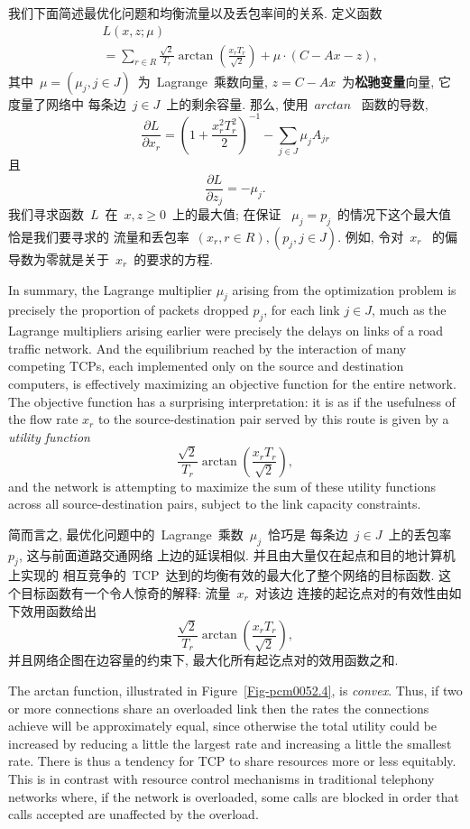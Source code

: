 \documentclass[a4paper,12pt, twocolumn]{article}
\begin{document}
我们下面简述最优化问题和均衡流量以及丢包率间的关系. 
定义函数
\begin{align*}
&L(x,z  ; \mu )  \\
&=\sum_{r\in R} \frac{\sqrt{2} }{T_r}    
\arctan \left( \frac{x_r T_r}{\sqrt{2} } \right)
+\mu \cdot (C -Ax-z ),
\end{align*}
其中~$\mu = (\mu_j, j \in J)$~为~Lagrange~乘数向量, 
$z = C- Ax$~为\textbf{松驰变量}向量, 它度量了网络中
每条边~$j \in J$~上的剩余容量. 那么, 使用~$arctan$~
函数的导数, 
$${{\frac{\partial L}{\partial x_r}}} = 
 \left( 1 +
\frac{x_r^2T_r^2}{2} \right)^{-1} 
 -\sum_{j\in J}\mu_j A_{jr}
$$
且
$${{\frac{\partial L}{\partial z_j}}} = -\mu_j. $$
我们寻求函数~$L$~在~$x, z \geq 0$~上的最大值; 在保证
~$\mu_j = p_j$~的情况下这个最大值恰是我们要寻求的
流量和丢包率~$(x_r, r \in R), (p_j, j \in J)$. 例如, 令对~$x_{r}$~
的偏导数为零就是关于~$x_{r}$~的要求的方程. 

In summary, the Lagrange multiplier $\mu_j$ arising from
the optimization problem  is precisely the 
proportion of packets dropped $p_j$, for each link $j \in J$, 
much as the Lagrange multipliers arising earlier
were precisely the delays on 
links of a road traffic network. And the equilibrium
reached by the interaction of many competing TCPs,
each implemented only on the source and destination computers, 
is effectively maximizing an objective function for the
entire network. The objective function has a surprising  
interpretation: it is as if the usefulness of
the flow rate $x_r$ to the source-destination pair 
served by this route is given by a {\it utility function}
\[
 \frac{\sqrt{2} }{T_r}
\arctan \left( \frac{x_r T_r}{\sqrt{2} } \right),
\]
and the network is attempting to maximize the sum of these
utility functions across all source-destination pairs, 
subject to the link capacity constraints.

简而言之, 最优化问题中的~Lagrange~乘数~$\mu_{j}$~恰巧是
每条边~$j \in J$~上的丢包率~$p_{j}$, 这与前面道路交通网络
上边的延误相似. 并且由大量仅在起点和目的地计算机上实现的
相互竞争的~TCP~达到的均衡有效的最大化了整个网络的目标函数. 
这个目标函数有一个令人惊奇的解释: 流量~$x_{r}$~对该边
连接的起讫点对的有效性由如下效用函数给出
\[
 \frac{\sqrt{2} }{T_r}
\arctan \left( \frac{x_r T_r}{\sqrt{2} } \right),
\]
并且网络企图在边容量的约束下, 最大化所有起讫点对的效用函数之和. 

The arctan function, illustrated in Figure~\ref{Fig-pcm0052.4},
is {\it convex}.  Thus, if two or more connections share an
overloaded link then the rates the connections achieve 
will be approximately 
equal, since otherwise the total utility could be increased
by reducing a little the largest rate and increasing a 
little the smallest rate. There is thus a tendency for TCP to 
share resources more or less equitably. 
This is in contrast with resource control
mechanisms in traditional telephony networks
where,  if the network is overloaded, some calls
are blocked in order
that calls accepted are unaffected by the overload.
\end{document}
